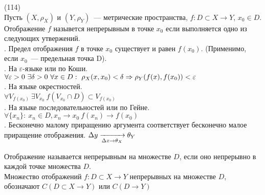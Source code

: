 (114)\\
Пусть $(X, \rho_X)$ и $(Y, \rho_Y)$~--- метрические пространства, $f: D\subset X \to Y$, $x_0 \in D$. Отображение $f$ назывется непрерывным в точке $x_0$ если выполняется одно из следующих утвержений.\\
. Предел отображения $f$ в точке $x_0$ существует и равен $f(x_0)$. (Применимо, если $x_0$~--- предельная точка D).\\
. \q На $\varepsilon$-языке или по Коши.\\
$\forall \varepsilon > 0\ \exists \delta > 0\ \forall x \in D:\ \rho_X(x, x_0) < \delta \Rightarrow \rho_Y(f(x), f(x_0)) < \varepsilon$\\
. \q На языке окрестностей.\\
$\forall V_{f(x_0)}\ \exists V_{x_0}\ f(V_{x_0} \cap D) \subset V_{f(x_0)}$\\
. \q На языке последовательностей или по Гейне.\\
$\forall \{x_n\}:\ x_n \in D, x_n \to x_0\ f(x_n) \to f(x_0)$\\
. Бесконечно малому приращению аргумента соответствует бесконечно малое приращение отображения. $\Delta y \xrightarrow[\Delta x \to \theta_X]{} \theta_Y$

Отображение называется непрерывным на множестве $D$, если оно непрерывно в каждой точке множества $D$.\\
Множество отображений $f: D\subset X \to Y$ непрерывных на множестве $D$, обозначают $C(D\subset X\to Y)$ или $C(D\to Y)$